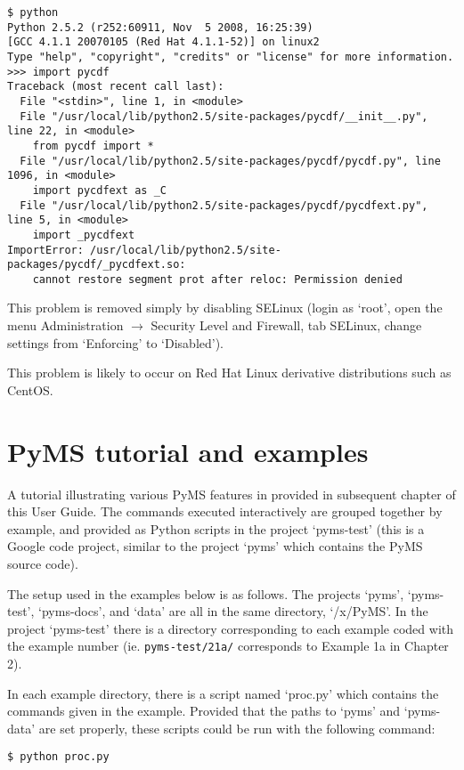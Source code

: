 \begin{verbatim}
$ python
Python 2.5.2 (r252:60911, Nov  5 2008, 16:25:39)
[GCC 4.1.1 20070105 (Red Hat 4.1.1-52)] on linux2
Type "help", "copyright", "credits" or "license" for more information.
>>> import pycdf
Traceback (most recent call last):
  File "<stdin>", line 1, in <module>
  File "/usr/local/lib/python2.5/site-packages/pycdf/__init__.py", line 22, in <module>
    from pycdf import *
  File "/usr/local/lib/python2.5/site-packages/pycdf/pycdf.py", line 1096, in <module>
    import pycdfext as _C
  File "/usr/local/lib/python2.5/site-packages/pycdf/pycdfext.py", line 5, in <module>
    import _pycdfext
ImportError: /usr/local/lib/python2.5/site-packages/pycdf/_pycdfext.so:
    cannot restore segment prot after reloc: Permission denied
\end{verbatim}

This problem is removed simply by disabling SELinux (login as `root', open the
menu Administration $\rightarrow$ Security Level and Firewall, tab SELinux,
change settings from `Enforcing' to `Disabled').

This problem is likely to occur on Red Hat Linux derivative distributions such
as CentOS.

\section{PyMS tutorial and examples}

A tutorial illustrating various PyMS features in provided in subsequent chapter
of this User Guide. The commands executed interactively are grouped together
by example, and provided as Python scripts in the project `pyms-test' (this is
a Google code project, similar to the project `pyms' which contains the PyMS
source code).

The setup used in the examples below is as follows. The projects `pyms',
`pyms-test', `pyms-docs', and `data' are all in the same directory,
`/x/PyMS'. In the project `pyms-test' there is a directory corresponding to
each example coded with the example number (ie. {\tt pyms-test/21a/}
corresponds to Example 1a in Chapter 2).

In each example directory, there is a script named `proc.py' which contains
the commands given in the example.  Provided that the paths to `pyms' and
`pyms-data' are set properly, these scripts could be run with the following
command:

\begin{verbatim}
$ python proc.py
\end{verbatim}

